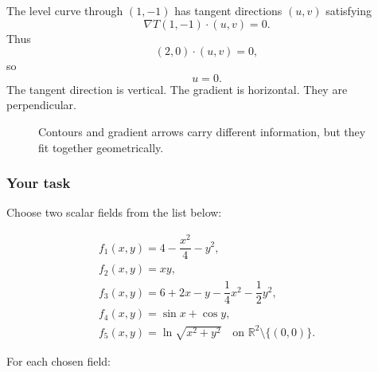 The level curve through \((1,-1)\) has tangent directions \((u,v)\) satisfying
\[
    \nabla T(1,-1)\cdot(u,v)=0.
\]
Thus
\[
    (2,0)\cdot(u,v)=0,
\]
so
\[
    u=0.
\]
The tangent direction is vertical.  The gradient is horizontal.  They are perpendicular.

\begin{figure}[h]
\centering
{}
\caption{Contours and gradient arrows carry different information, but they fit
together geometrically.}
\end{figure}

\subsubsection*{Your task}

Choose two scalar fields from the list below:

\[
\begin{array}{c}
f_1(x,y)=4-\dfrac{x^2}{4}-y^2,\\[3mm]
f_2(x,y)=xy,\\[1mm]
f_3(x,y)=6+2x-y-\dfrac14x^2-\dfrac12y^2,\\[3mm]
f_4(x,y)=\sin x+\cos y,\\[1mm]
f_5(x,y)=\ln\sqrt{x^2+y^2}\quad\text{on }\mathbb R^2\setminus\{(0,0)\}.
\end{array}
\]

For each chosen field:

